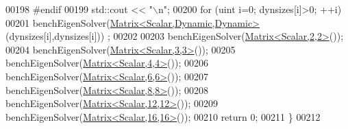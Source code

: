 \begin{DoxyCode}
00198 \textcolor{preprocessor}{  #endif}
00199   std::cout << \textcolor{stringliteral}{"\(\backslash\)n"};
00200   \textcolor{keywordflow}{for} (uint i=0; dynsizes[i]>0; ++i)
00201     benchEigenSolver(\hyperlink{group___core___module}{Matrix<Scalar,Dynamic,Dynamic>}(dynsizes[i],dynsizes[i]))
      ;
00202 
00203   benchEigenSolver(\hyperlink{group___core___module_class_eigen_1_1_matrix}{Matrix<Scalar,2,2>}());
00204   benchEigenSolver(\hyperlink{group___core___module_class_eigen_1_1_matrix}{Matrix<Scalar,3,3>}());
00205   benchEigenSolver(\hyperlink{group___core___module_class_eigen_1_1_matrix}{Matrix<Scalar,4,4>}());
00206   benchEigenSolver(\hyperlink{group___core___module_class_eigen_1_1_matrix}{Matrix<Scalar,6,6>}());
00207   benchEigenSolver(\hyperlink{group___core___module_class_eigen_1_1_matrix}{Matrix<Scalar,8,8>}());
00208   benchEigenSolver(\hyperlink{group___core___module_class_eigen_1_1_matrix}{Matrix<Scalar,12,12>}());
00209   benchEigenSolver(\hyperlink{group___core___module_class_eigen_1_1_matrix}{Matrix<Scalar,16,16>}());
00210   \textcolor{keywordflow}{return} 0;
00211 \}
00212 
\end{DoxyCode}

